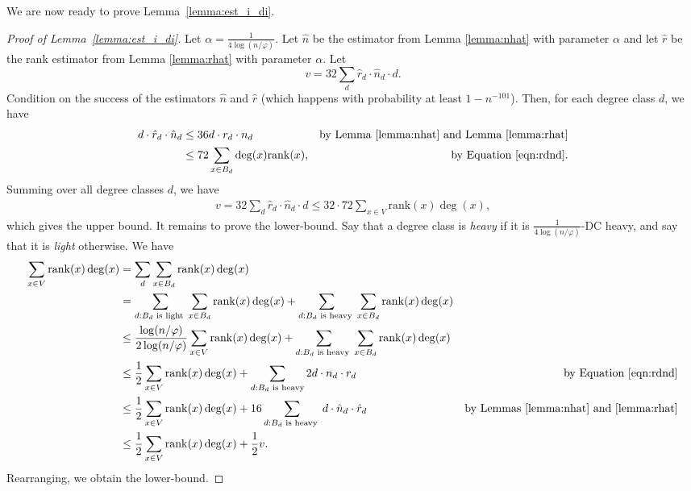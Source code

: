 \documentclass[letterpaper,11pt]{article}
\newcommand{\rank}{\mathrm{rank}}
\theoremstyle{plain}
\theoremstyle{definition}
\theoremstyle{remark}
\begin{document}
We are now ready to prove Lemma~\ref{lemma:est_i_di}.
\begin{proof}[Proof of Lemma~\ref{lemma:est_i_di}]
Let $\alpha = \frac{1}{4\log (n/\varphi)}$. Let $\hat{n}$ be the estimator from Lemma \ref{lemma:nhat}  with parameter $\alpha$ and let $\hat{r}$ be the rank estimator from Lemma \ref{lemma:rhat} with parameter $\alpha$. Let 
\[v = 32 \sum_{d} \hat{r}_d \cdot \hat{n}_d \cdot d.\]
Condition on the success of the estimators $\hat{n}$ and $\hat{r}$ (which happens with probability at least $1-n^{-101}$). Then, for each degree class $d$, we have
\begin{align*}
  d \cdot \hat{r}_d \cdot \hat{n}_d & \leq 36 d\cdot r_d \cdot n_d  & \text{by Lemma \ref{lemma:nhat} and Lemma \ref{lemma:rhat}}\\
  & \leq 72 \sum_{x \in B_d} \deg(x) \rank(x), & \text{by Equation \eqref{eqn:rdnd}.}
\end{align*}
Summing over all degree classes $d$, we have 
\begin{align*}
    v  = 32 \sum_{d} \hat{r}_d \cdot \hat{n}_d \cdot d  \leq 32 \cdot 72 \sum_{x \in V} \rank(x) \deg(x), 
\end{align*} which gives the upper bound. 
It remains to prove the lower-bound. Say that a degree class is \emph{heavy} if it is $\frac{1}{4\log (n/\varphi)}$-DC heavy, and say that it is \emph{light} otherwise. We have
\begin{align*}
    \sum_{x \in V} \rank(x) \deg(x) &= \sum_d \sum_{x \in B_d} \rank(x) \deg(x) &  \\
    & = \sum_{d: B_d \text{ is light }}\sum_{x \in B_d} \rank(x) \deg(x) +  \sum_{d: B_d \text{ is heavy } } \sum_{x \in B_d} \rank(x) \deg(x) & \\
    & \leq \frac{\log(n/\varphi)}{2 \log(n/\varphi)} \sum_{x \in V}\rank(x) \deg(x) +   \sum_{d: B_d \text{ is heavy } } \sum_{x \in B_d} \rank(x) \deg(x)& \\
    & \leq \frac{1}{2}\sum_{x \in V}\rank(x) \deg(x) + \sum_{d:B_d \text{ is heavy}} 2d \cdot n_d \cdot r_d  & \text{by Equation \eqref{eqn:rdnd}}\\
    & \leq  \frac{1 }{2} \sum_{x \in V} \rank(x) \deg(x) +  16 \sum_{d: B_d \text{ is heavy } }d \cdot \hat{n}_d \cdot \hat{r}_d &\text{by Lemmas \ref{lemma:nhat} and \ref{lemma:rhat}}\\
   &  \leq \frac{1}{2}\sum_{x \in V} \rank(x) \deg(x) +  \frac{1}{2}v. & 
\end{align*}
Rearranging, we obtain the lower-bound. 
\end{proof}
\end{document}
